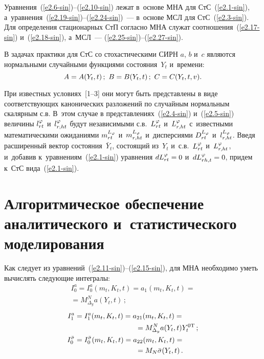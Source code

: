 \begin{multicols}{2}
Уравнения~(\ref{e2.6-sin})--(\ref{e2.10-sin}) лежат в~основе МНА для СтС~(\ref{e2.1-sin}),
а~уравнения~(\ref{e2.19-sin})--(\ref{e2.24-sin})~--- в~основе МСЛ для СтС~(\ref{e2.3-sin}).
Для определения стационарных СтП согласно МНА служат соотношения~(\ref{e2.17-sin}) и~(\ref{e2.18-sin}),
а~МСЛ~--- (\ref{e2.25-sin})--(\ref{e2.27-sin}).

В задачах практики для СтС со стохастическими СИРН  $a$, $b$ и~$c$
являются нормальными случайными функциями состояния~$Y_t$ и~времени:
$$
A=A(Y_t, t)\,;\ B=B(Y_t, t)\,;\  C\hm=C(Y_t, t, v).
$$

При известных
условиях~[1--3] они могут быть представлены в виде соответствующих
канонических разложений по случайным нормальным скалярным с.в.
В~этом случае в представлениях~(\ref{e2.4-sin}) и~(\ref{e2.5-sin}) величины
$l_{rt}^\varphi$ и~$l_{r,ht}^\varphi$ будут независимыми с.в.~$L_{rt}^\varphi$
и~$L_{r,ht}^\varphi$ с~известными математическими ожиданиями
$m_{rt}^{L_\varphi}$ и~$m_{r,ht}^{L_\varphi}$ и~дисперсиями
$D_{rt}^{L_\varphi}$ и~$l_{r,ht}^{L_\varphi}$. Введя расширенный вектор
состояния~$\bar Y_t$, состоящий из~$Y_t$ и~с.в.~$L_{rt}^\varphi$
и~$L_{r,ht}^\varphi$, и~добавив к~уравнениям~(\ref{e2.1-sin}) уравнения $dL_{rt}^\vrp
\hm=0$ и~$dL_{rh,t}^\vrp \hm=0$, придем к~СтС вида~(\ref{e2.1-sin}).

\section{Алгоритмическое обеспечение аналитического и~статистического моделирования}

Как следует из уравнений~(\ref{e2.11-sin})--(\ref{e2.15-sin}),
для МНА необходимо уметь вычислять следующие инте\-гралы:
\begin{multline}
I_0^a = I_0^a (m_t, K_t, t) = a_1 (m_t, K_t, t)={} \\
{}=M_{\Delta_y}^N a(Y_t, t)\,;\label{e3.1-sin}
\end{multline}
\noindent
\begin{align}
I_1^a &= I_1^a (m_t, K_t, t)= a_{21}(m_t, K_t, t)={}\notag\\
&\hspace*{30mm}{}=M_{\Delta_y}^N a(Y_t , t) Y_t^{0\mathrm{T}}\,;\label{e3.2-sin}\\
I_0^{\bar \sigma} &= I_0^{\bar \sigma} (m_t, K_t, t) = a_{22}(m_t, K_t, t) ={}\notag\\
&\hspace*{30mm}{}=M_N \bar \sigma (Y_t, t)\,.\label{e3.3-sin}
\end{align}


\end{multicols}
